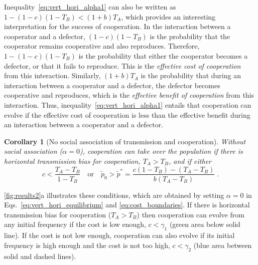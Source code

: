 \documentclass[12pt]{extarticle}
\newtheorem{corollary}{Corollary}
\begin{document}
{%
Inequality~\ref{eq:vert_hori_alpha1} can also be written as
$1 - (1-c)(1-T_B) < (1+b) T_A$,
which provides an interesting interpretation for the success of cooperation. 
In the interaction between a cooperator and a defector, $(1-c)(1-T_B)$ is the probability that the cooperator remains cooperative and also reproduces. 
Therefore, $1 - (1-c)(1-T_B)$ is the probability that either the cooperator becomes a defector, or that it fails to reproduce.
This is the \emph{effective cost of cooperation} from this interaction.
Similarly, $(1+b) T_A$ is the probability that during an interaction between a cooperator and a defector, the defector becomes cooperative and reproduces, which is the \emph{effective benefit of cooperation} from this interaction.
Thus, inequality~\ref{eq:vert_hori_alpha1} entails that cooperation can evolve if the effective cost of cooperation is less than the effective benefit during an interaction between a cooperator and a defector.
\\

\begin{corollary}[No social association of transmission and cooperation]
Without social association ($\alpha=0$), cooperation can take over the population if there is horizontal transmission bias for cooperation, $T_A>T_B$, and if either
\begin{equation}
\label{eq:vert_hori_alpha0}
c < \frac{T_A-T_B}{1-T_B}
\quad \text{or} \quad
\tilde{p}_0 > \tilde{p}^* = \frac{c(1-T_B) - (T_A-T_B)}{b (T_A-T_B)} \;.
\end{equation}
\end{corollary}

\autoref{fig:results2}a illustrates these conditions, which are obtained by setting $\alpha=0$ in Eqs.\ \ref{eq:vert_hori_equilibrium} and \ref{eq:cost_boundaries}. If there is horizontal transmission bias for cooperation ($T_A>T_B$) then cooperation can evolve from any initial frequency if the cost is low enough, $c<\gamma_1$ (green area below solid line). If the cost is not low enough, cooperation can also evolve if its initial frequency is high enough and the cost is not too high, $c<\gamma_2$ (blue area between solid and dashed lines). 

}
\end{document}

